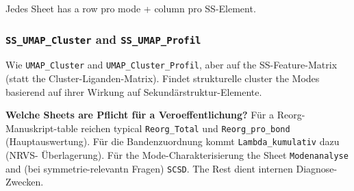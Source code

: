 \documentclass[11pt,a4paper,twoside]{article}
\theoremstyle{remark}
\begin{document}
Jedes Sheet has a row pro mode + column pro SS-Element.

\subsubsection*{\texttt{SS\_UMAP\_Cluster} and \texttt{SS\_UMAP\_Profil}}

Wie \texttt{UMAP\_Cluster} and \texttt{UMAP\_Cluster\_Profil}, aber
auf the SS-Feature-Matrix (statt the Cluster-Liganden-Matrix). Findet
strukturelle cluster the Modes basierend auf ihrer Wirkung auf
Sekund\"arstruktur-Elemente.

\begin{infobox}
\textbf{Welche Sheets are Pflicht f\"ur a Veroeffentlichung?}
F\"ur a Reorg-Manuskript-table reichen typical \texttt{Reorg\_Total}
und \texttt{Reorg\_pro\_bond} (Hauptauswertung). F\"ur die
Bandenzuordnung kommt \texttt{Lambda\_kumulativ} dazu (NRVS-
\"Uberlagerung). F\"ur the Mode-Charakterisierung the Sheet
\texttt{Modenanalyse} and (bei symmetrie-relevantn Fragen)
\texttt{SCSD}. The Rest dient internen Diagnose-Zwecken.
\end{infobox}


\end{document}

